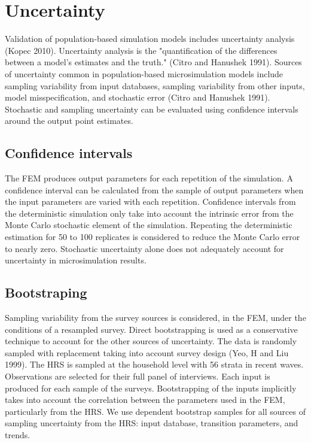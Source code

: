 \section{Uncertainty}
Validation of population-based simulation models includes uncertainty analysis (Kopec 2010). Uncertainty analysis 
is the "quantification of the differences between a model's estimates and the truth." (Citro and Hanushek 1991). Sources of 
uncertainty common in population-based microsimulation models include sampling variability from input databases, sampling 
variability from other inputs, model misspecification, and stochastic error (Citro and Hanushek 1991). Stochastic and sampling 
uncertainty can be evaluated using confidence intervals around the output point estimates.  

\subsection{Confidence intervals}
The FEM produces output parameters for each repetition of the simulation. A confidence interval can be calculated from the sample 
of output parameters when the input parameters are varied with each repetition. Confidence intervals from the deterministic simulation 
only take into account the intrinsic error from the Monte Carlo stochastic element of the simulation. Repeating the deterministic estimation 
for 50 to 100 replicates is considered to reduce the Monte Carlo error to nearly zero. Stochastic uncertainty alone does not adequately 
account for uncertainty in microsimulation results.

\subsection{Bootstraping}
Sampling variability from the survey sources is considered, in the FEM, under the conditions of a resampled survey. Direct 
bootstrapping is used as a conservative technique to account for the other sources of uncertainty. The data is randomly sampled with replacement 
taking into account survey design (Yeo, H and Liu 1999). The HRS is sampled at the household level with 56 strata in recent waves. 
Observations are selected for their full panel of interviews. Each input is produced for each sample of the surveys. Bootstrapping of 
the inputs implicitly takes into account the correlation between the parameters used in the FEM, particularly from the HRS. We use dependent 
bootstrap samples for all sources of sampling uncertainty from the HRS: input database, transition parameters, and trends.

